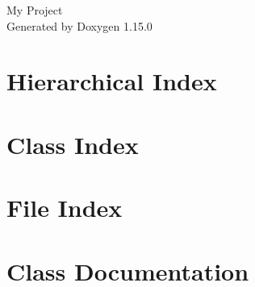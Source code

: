 \documentclass[twoside]{book}
\newcommand{\+}{\discretionary{\mbox{\scriptsize$\hookleftarrow$}}{}{}}
\newcommand{\clearemptydoublepage}{%
    \newpage{\pagestyle{empty}\cleardoublepage}%
  }
\begin{document}
  \raggedbottom
    \hypersetup{pageanchor=false,
                bookmarksnumbered=true,
                pdfencoding=unicode
               }
  \begin{titlepage}
  \vspace*{7cm}
  \begin{center}%
  {\Large My Project}\\
  \vspace*{1cm}
  {\large Generated by Doxygen 1.15.0}\\
  \end{center}
  \end{titlepage}
  \clearemptydoublepage
  \tableofcontents
  \clearemptydoublepage
  \hypersetup{pageanchor=true}
\chapter{Hierarchical Index}

\chapter{Class Index}

\chapter{File Index}

\chapter{Class Documentation}
































\end{document}
